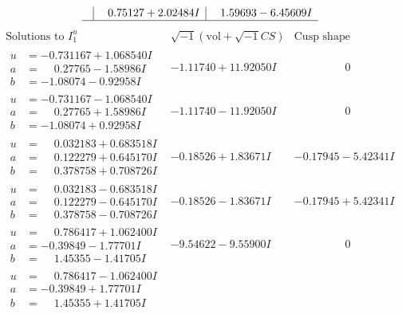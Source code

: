 \documentclass[1p]{elsarticle_modified}
\theoremstyle{definition}
\newcommand{\I}{\sqrt{-1}}
\begin{document}
$$\begin{array}{c|c|c}
 & \phantom{-}0.75127 + 2.02484 I & \phantom{-}1.59693 - 6.45609 I\\
 \hline 
 \end{array}$$\newpage$$\begin{array}{c|c|c}  
\text{Solutions to }I^u_{1}& \I (\text{vol} + \sqrt{-1}CS) & \text{Cusp shape}\\
 \hline 
\begin{aligned}
u &= -0.731167 + 1.068540 I \\
a &= \phantom{-}0.27765 - 1.58986 I \\
b &= -1.08074 - 0.92958 I\end{aligned}
 & -1.11740 + 11.92050 I & \phantom{-0.000000 } 0 \\ \hline\begin{aligned}
u &= -0.731167 - 1.068540 I \\
a &= \phantom{-}0.27765 + 1.58986 I \\
b &= -1.08074 + 0.92958 I\end{aligned}
 & -1.11740 - 11.92050 I & \phantom{-0.000000 } 0 \\ \hline\begin{aligned}
u &= \phantom{-}0.032183 + 0.683518 I \\
a &= \phantom{-}0.122279 + 0.645170 I \\
b &= \phantom{-}0.378758 + 0.708726 I\end{aligned}
 & -0.18526 + 1.83671 I & -0.17945 - 5.42341 I \\ \hline\begin{aligned}
u &= \phantom{-}0.032183 - 0.683518 I \\
a &= \phantom{-}0.122279 - 0.645170 I \\
b &= \phantom{-}0.378758 - 0.708726 I\end{aligned}
 & -0.18526 - 1.83671 I & -0.17945 + 5.42341 I \\ \hline\begin{aligned}
u &= \phantom{-}0.786417 + 1.062400 I \\
a &= -0.39849 - 1.77701 I \\
b &= \phantom{-}1.45355 - 1.41705 I\end{aligned}
 & -9.54622 - 9.55900 I & \phantom{-0.000000 } 0 \\ \hline\begin{aligned}
u &= \phantom{-}0.786417 - 1.062400 I \\
a &= -0.39849 + 1.77701 I \\
b &= \phantom{-}1.45355 + 1.41705 I\end{aligned}

\end{array}$$
\end{document}
